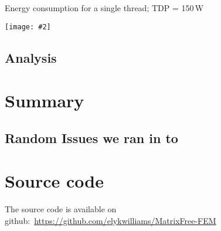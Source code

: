 \documentclass[12pt]{article}
\newcommand{\includegraphicsw}[2][1.]{\texttt{[image: \#2]}}
\begin{document}
\begin{table}[H]
	\centering\caption{Energy consumption for a single thread; TDP = 150\,W}
	\includegraphicsw[.9]{rapl.pdf}
\end{table}

\subsection{Analysis}

\section{Summary}

\subsection{Random Issues we ran in to}



\section{Source code}\label{sec:source}

The source code is available on github:~\url{https://github.com/elykwilliams/MatrixFree-FEM}







\end{document}
